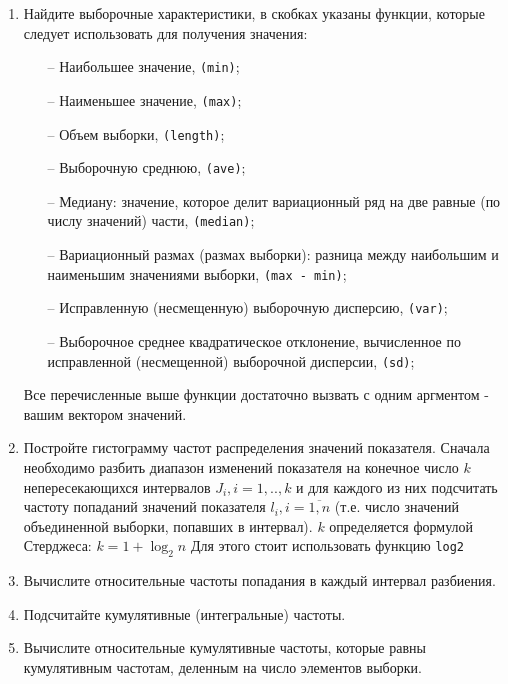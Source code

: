 \begin{enumerate}
	\item Найдите выборочные характеристики, в скобках указаны функции, которые следует использовать для получения значения:
		\begin{itemize}
			\item[--] Наибольшее значение, \texttt{(min)};
			\item[--] Наименьшее значение, \texttt{(max)};
			\item[--] Объем выборки, \texttt{(length)};
			\item[--] Выборочную среднюю, \texttt{(ave)};
			\item[--] Медиану: значение, которое делит вариационный ряд на две равные (по числу значений) части, \texttt{(median)};
			\item[--] Вариационный размах (размах выборки): разница между наибольшим и наименьшим значениями выборки, \texttt{(max - min)}; 
			\item[--] Исправленную (несмещенную) выборочную дисперсию, \texttt{(var)};
			\item[--] Выборочное среднее квадратическое отклонение, вычисленное по исправленной (несмещенной) выборочной дисперсии, \texttt{(sd)};
		\end{itemize}
		Все перечисленные выше функции достаточно вызвать с одним аргментом - вашим вектором значений.

	\item Постройте гистограмму частот распределения значений показателя.
		Сначала необходимо разбить диапазон изменений показателя на конечное число $k$
		непересекающихся интервалов $J_{i}, i=1,..,k$  и для каждого из них 
		подсчитать частоту попаданий значений показателя $l_{i}, i=\overline{1,n}$
		(т.е. число значений объединенной выборки, попавших в интервал).
		$k$ определяется формулой Стерджеса: $k=1+\log_2 n $
		Для этого стоит использовать функцию \texttt{log2}

	\item Вычислите относительные частоты попадания в каждый интервал разбиения.

	\item Подсчитайте кумулятивные (интегральные) частоты.

	\item Вычислите относительные кумулятивные частоты, которые равны кумулятивным частотам, деленным на число элементов выборки.

\end{enumerate}
